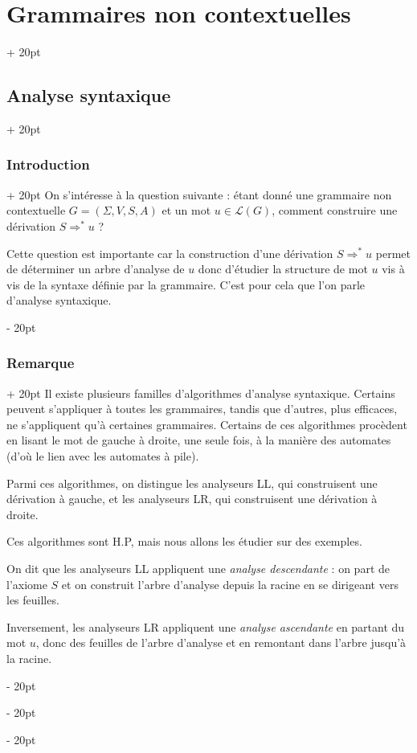 \documentclass[a4paper, 12pt, twoside]{article}
\newcommand{\lr}[1]{\left( #1 \right)}
\newcommand{\ind}[1][20pt]{\advance\leftskip + #1}
\newcommand{\deind}[1][20pt]{\advance\leftskip - #1}
\newenvironment{indt}[2][20pt]{#2 \par \ind[#1]}{\par \deind} %
\begin{document}
\begin{indt}{\section{Grammaires non contextuelles}}
        \begin{indt}{\subsection{Analyse syntaxique}}
            \begin{indt}{\subsubsection{Introduction}}
                On s'intéresse à la question suivante : étant donné une grammaire non contextuelle $G = \lr{\Sigma, V, S, A}$ et un mot $u \in \mathcal L(G)$, comment construire une dérivation $S \Rightarrow^* u$ ?

                Cette question est importante car la construction d'une dérivation $S \Rightarrow^* u$ permet de déterminer un arbre d'analyse de $u$ donc d'étudier la structure de mot $u$ vis à vis de la syntaxe définie par la grammaire.
                C'est pour cela que l'on parle d'analyse syntaxique.
            \end{indt}

            \vspace{12pt}
            
            \begin{indt}{\subsubsection{Remarque}}
                Il existe plusieurs familles d'algorithmes d'analyse syntaxique. Certains peuvent s'appliquer à toutes les grammaires, tandis que d'autres, plus efficaces, ne s'appliquent qu'à certaines grammaires.
                Certains de ces algorithmes procèdent en lisant le mot de gauche à droite, une seule fois, à la manière des automates (d'où le lien avec les automates à pile).

                Parmi ces algorithmes, on distingue les analyseurs LL, qui construisent une dérivation à gauche, et les analyseurs LR, qui construisent une dérivation à droite.

                Ces algorithmes sont H.P, mais nous allons les étudier sur des exemples.

                On dit que les analyseurs LL appliquent une \emph{analyse descendante} : on part de l'axiome $S$ et on construit l'arbre d'analyse depuis la racine en se dirigeant vers les feuilles.

                Inversement, les analyseurs LR appliquent une \emph{analyse ascendante} en partant du mot $u$, donc des feuilles de l'arbre d'analyse et en remontant dans l'arbre jusqu'à la racine.
            \end{indt}


\end{indt}
\end{indt}
\end{document}
